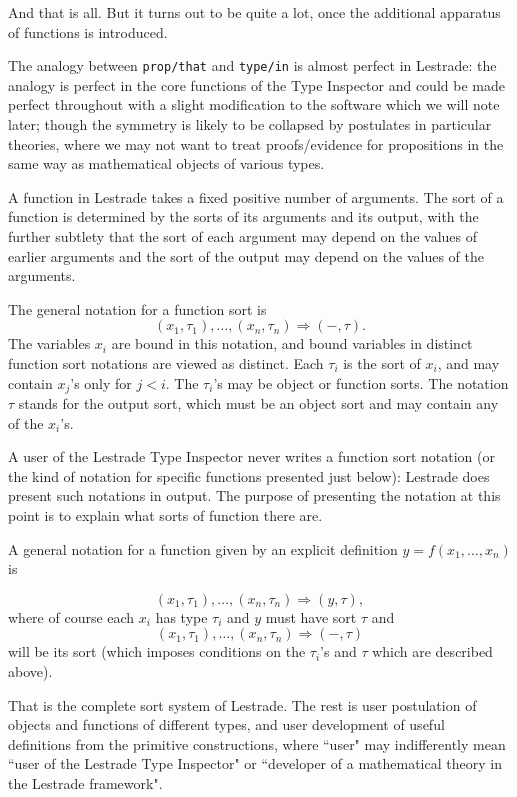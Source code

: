 \documentclass[12pt]{article}
\begin{document}
And that is all.  But it turns out to be quite a lot, once the additional apparatus of functions is introduced.

The analogy between {\tt prop/that} and {\tt type/in} is almost perfect in Lestrade:  the analogy is perfect in the core functions of the Type Inspector and could be made perfect throughout with a slight modification to the software which we will note later;  though the symmetry is likely to be collapsed by
postulates in particular theories, where we may not want to treat proofs/evidence for propositions in the same way as mathematical objects of various types.


A function in Lestrade takes a fixed positive number of arguments.  The sort of a function is determined by the sorts of its arguments and its output,
with the further subtlety that the sort of each argument may depend on the values of earlier arguments and the sort of the output may depend on the values of the arguments.

The general notation for a function sort is $$(x_1,\tau_1),\ldots,(x_n,\tau_n)\Rightarrow (-,\tau).$$  The variables $x_i$ are bound in this notation, and bound variables in distinct function sort notations are viewed as distinct.  Each $\tau_i$ is the sort of $x_i$, and may contain $x_j$'s only for $j<i$.  The $\tau_i$'s may be object or function sorts.  The notation $\tau$ stands for the output sort, which must be an object sort and may contain any of the $x_i$'s.

A user of the Lestrade Type Inspector never writes a function sort notation (or the  kind of notation for specific functions presented just below):  Lestrade does present such notations in output.  The purpose of presenting the notation at this point is to explain what sorts of function there are.

A general notation for a function given by an explicit definition $y=f(x_1,\ldots,x_n)$ is

$$(x_1,\tau_1),\ldots,(x_n,\tau_n)\Rightarrow (y,\tau),$$  where of course each $x_i$ has type $\tau_i$ and $y$ must have sort $\tau$ and $$(x_1,\tau_1),\ldots,(x_n,\tau_n)\Rightarrow (-,\tau)$$ will be its sort (which imposes conditions on the $\tau_i$'s and $\tau$ which are described above).

That is the complete sort system of Lestrade.  The rest is user postulation of objects and functions of different types, and user development of useful definitions from the primitive constructions, where ``user" may indifferently mean ``user of the Lestrade Type Inspector" or ``developer of a mathematical theory in the Lestrade framework".
\end{document}

